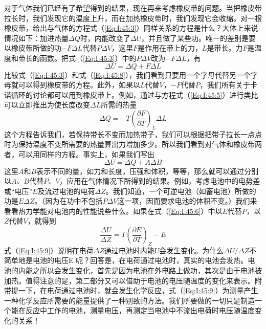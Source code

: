 对于气体我们已经有了希望得到的结果，现在再来考虑橡皮带的问题。当把橡皮带拉长时，我们发现它的温度上升，而在加热橡皮带时，我们发现它会收缩。对一根橡皮带，给出与气体的方程式（\ref{Eq:I:45:3}）同样关系的方程是什么？大体上来说情况如下：加进热量$\Delta Q$时，内能改变了$\Delta U$，并且做了某些功。唯一的差别是要以橡皮带所做的功$-F\Delta L$代替$P \Delta V$，这里$F$是作用在带上的力，$L$是带长。力$F$是温度和带长的函数。把式（\ref{Eq:I:45:3}）中的$P \Delta V$改为$-F \Delta L$，有
\begin{equation}
    \label{Eq:I:45:8}
    \Delta U = \Delta Q + F\Delta L
\end{equation}
比较式（\ref{Eq:I:45:3}）和式（\ref{Eq:I:45:8}），我们看到只要用一个字母代替另一个字母就可以得到橡皮带的方程。此外，如果以$L$代替$V$，$-F$代替$P$，我们所有关于卡诺循环的讨论都可以用到橡皮带上。例如，通过与方程式（\ref{Eq:I:45:5}）进行类比可以立即推出为使长度改变$\Delta L$所需的热量
\begin{equation*}
    \Delta Q = -T\left(\frac{\partial F}{\partial T}\right)_L \Delta L
\end{equation*}
这个方程告诉我们，若保持带长不变而加热带子，我们可以根据把带子拉长一点点时为保持温度不变所需要的热量算出力增加多少。所以我们看到对气体和橡皮带两者，可以用同样的方程。事实上，如果我们写出
\begin{equation*}
    \Delta U = \Delta Q + A\Delta B
\end{equation*}
这里$A$和$B$表示不同的量，如力和长度，压强和体积，等等，那么就可以通过分别以$A$、$B$代替$P$、$V$，应用在气体情况下所得到的结果。例如，考虑电池中的电势差或“电压”$E$及流过电池的电荷$\Delta Z$。我们知道，一个可逆电池（如蓄电池）所做的功是$E \Delta Z$。（因为在功中不包括$P \Delta V$这一项，因而要求电池的体积不变。）我们来看看热力学能对电池内的性能说些什么。如果在式（\ref{Eq:I:45:6}）中以$E$代替$P$，以$Z$代替$V$，就得到
\begin{equation}
    \label{Eq:I:45:9}
    \frac{\Delta U}{\Delta Z} = T\left(\frac{\partial E}{\partial T}\right)_Z - E
\end{equation}
式（\ref{Eq:I:45:9}）说明在电荷$\Delta Z$通过电池时内能$U$会发生变化。为什么$\Delta U /\Delta Z$不简单地是电池的电压E 呢？回答是，在电荷通过电池时，真实的电池会发热。电池的内能之所以会发生变化，首先是因为电池在外电路上做功，其次是由于电池被加热。值得注意的是，第二部分又可以借助于电池的电压随温度的变化来表示。附带提一下，在电荷通过电池时，就会发生化学反应，式（\ref{Eq:I:45:9}）为测量产生一种化学反应所需要的能量提供了一种别致的方法。我们所要做的一切只是制造一个能在反应中工作的电池，测量电压，再测定当电池中不流出电荷时电压随温度变化的关系！

